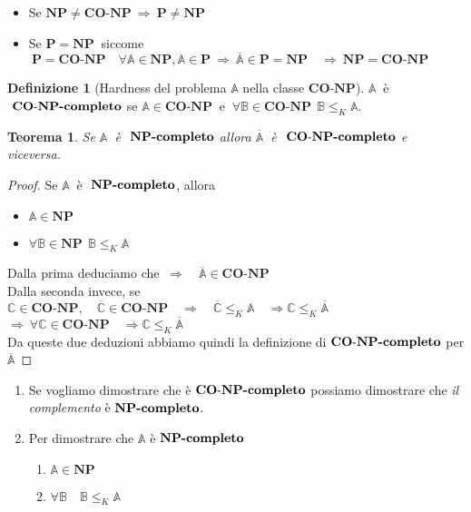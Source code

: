 \documentclass[a4paper]{article}
\newtheorem{thm}{Teorema}[subsection]
\theoremstyle{definition}
\newtheorem{definit}{Definizione}[subsection]
\newcommand{\p}{\mathbf{P}}
\newcommand{\np}{\mathbf{NP}}
\newcommand{\conp}{\mathbf{CO}\text{-}\mathbf{NP}}
\newcommand{\prob}[1]{\mathbb{#1}}
\begin{document}
 		\begin{itemize}
 			\item Se $ \np\neq \conp \ \Rightarrow \ \p\neq\np $
 			\item Se $ \p = \np\ $ siccome $ \ \p = \conp\quad \forall \prob{A}\in \np , \prob{A}\in \p \ \Rightarrow \ \overline{\prob{A}}\in \p = \np \quad \Rightarrow \ \np = \conp $ 
 		\end{itemize}
 		
 		\begin{definit}[Hardness del problema $ \prob{A} $ nella classe $ \conp $]
 			$ \prob{A}\ $ è $ \ \conp\text{\textbf{-completo}} $ se $ \prob{A}\in \conp\ $ e $ \ \forall \prob{B} \in \conp \ \ \prob{B}\leq_K\prob{A} $. 
 		\end{definit}
 		
 		\begin{thm}
 			Se $ \prob{A}\ $ è $ \ \np\text{\textbf{-completo}} $ allora $ \overline{\prob{A}}\ $ è  $ \ \conp\text{\textbf{-completo}} $ e viceversa.
 		\end{thm}
 		
 		\begin{proof}
 			Se $ \prob{A}\ $ è $ \ \np\text{\textbf{-completo}} $, allora
 			\begin{itemize}
 				\item $ \prob{A}\in\np $
 				\item $ \forall \prob{B} \in \np \ \ \prob{B}\leq_K\prob{A} $
 			\end{itemize}
 			Dalla prima deduciamo che $\  \Rightarrow\quad \overline{\prob{A}}\in\conp $ \\
  			Dalla seconda invece, se $ \prob{C}\in\conp,\quad \overline{\prob{C}}\in \conp \quad \Rightarrow \quad
  			\overline{\prob{C}}\leq_K\prob{A}\quad \Rightarrow \prob{C}\leq_K\overline{\prob{A}} $\\
  			$ \Rightarrow \ \forall\prob{C}\in\conp \quad \Rightarrow \prob{C}\leq_K\overline{\prob{A}}  $\\
  			Da queste due deduzioni abbiamo quindi la definizione di $ \conp\text{\textbf{-completo}} $ per $ \overline{\prob{A}} $
 		\end{proof}
 		
 		\begin{enumerate}
 			\item Se vogliamo dimostrare che è $ \conp\text{\textbf{-completo}} $ possiamo dimostrare che \textit{il complemento} è $ \np\text{\textbf{-completo}} $.
 			\item Per dimostrare che $ \prob{A} $ è $ \np\text{\textbf{-completo}} $
 			\begin{enumerate}
 				\item $ \prob{A} \in \np $
 				\item $ \forall\prob{B} \quad \prob{B}\leq_K \prob{A} $
 			\end{enumerate}
 		\end{enumerate}
 	
\end{document}
